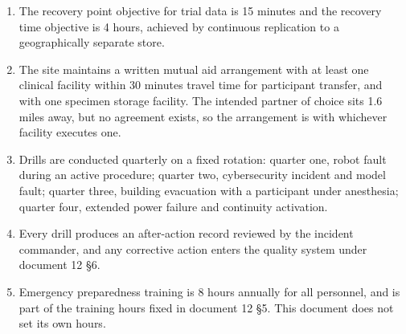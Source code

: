 \begin{enumerate}
\item The recovery point objective for trial data is 15 minutes and the recovery
  time objective is 4 hours, achieved by continuous replication to a
  geographically separate store.

\item The site maintains a written mutual aid arrangement with at least one
  clinical facility within 30 minutes travel time for participant transfer, and
  with one specimen storage facility. The intended partner of choice sits 1.6
  miles away, but no agreement exists, so the arrangement is with whichever
  facility executes one.

\item Drills are conducted quarterly on a fixed rotation: quarter one, robot
  fault during an active procedure; quarter two, cybersecurity incident and
  model fault; quarter three, building evacuation with a participant under
  anesthesia; quarter four, extended power failure and continuity activation.

\item Every drill produces an after-action record reviewed by the incident
  commander, and any corrective action enters the quality system under document
  12 §6.

\item Emergency preparedness training is 8 hours annually for all personnel, and
  is part of the training hours fixed in document 12 §5. This document does not
  set its own hours.
\end{enumerate}
